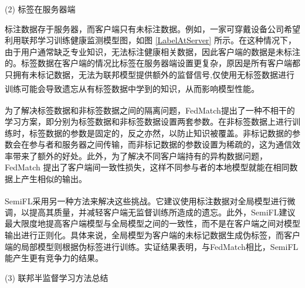 (2) 标签在服务器端

标注数据存于服务器，而客户端只有未标注数据。例如，一家可穿戴设备公司希望利用联邦学习训练健康监测模型图，如图 \ref{LabelAtServer} 所示。在这种情况下，由于用户通常缺乏专业知识，无法标注健康相关数据，因此客户端的数据是未标注的。标签数据在客户端的情况比标签在服务器端设置更复杂，原因是所有客户端都只拥有未标记数据，无法为联邦模型提供额外的监督信号,仅使用无标签数据进行训练可能会导致遗忘从有标签数据中学到的知识，从而影响模型性能\textsuperscript{\cite{jeong2020federated,diao2022semifl}}。



为了解决标签数据和非标签数据之间的隔离问题，FedMatch\textsuperscript{\cite{jeong2020federated}}提出了一种不相干的学习方案，即分别为标签数据和非标签数据设置两套参数。在非标签数据上进行训练时，标签数据的参数是固定的，反之亦然，以防止知识被覆盖。非标记数据的参数会在参与者和服务器之间传输，而非标记数据的参数设置为稀疏的，这为通信效率带来了额外的好处。此外，为了解决不同客户端持有的异构数据问题，FedMatch 提出了客户端间一致性损失，这样不同参与者的本地模型就能在相同数据上产生相似的输出。

SemiFL\textsuperscript{\cite{diao2022semifl}}采用另一种方法来解决这些挑战。它建议使用标注数据对全局模型进行微调，以提高其质量，并减轻客户端无监督训练所造成的遗忘。此外，SemiFL建议最大限度地提高客户端模型与全局模型之间的一致性，而不是在客户端之间对模型输出进行正则化。具体来说，全局模型为客户端的未标记数据生成伪标签，而客户端的局部模型则根据伪标签进行训练。实证结果表明，与FedMatch相比，SemiFL能产生更有竞争力的结果。

(3) 联邦半监督学习方法总结

